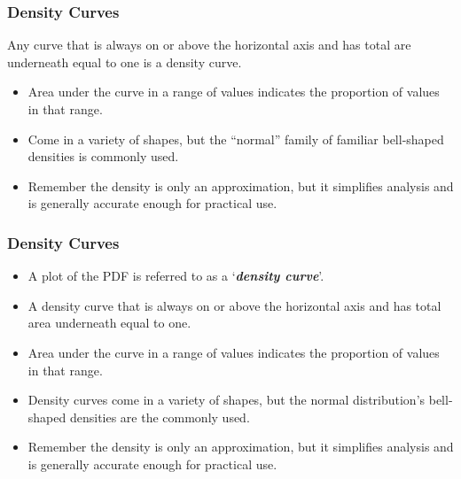\begin{frame}
\large
\frametitle{Density Curves}
Any curve that is always on or above the horizontal axis and has
total are underneath equal to one is a density curve.
\begin{itemize}
\item Area under the curve in a range of values indicates the proportion of values in that range.
\item Come in a variety of shapes, but the ``normal” family of familiar
bell-shaped densities is commonly used.
\item Remember the density is only an approximation, but it simpliﬁes analysis and is generally accurate enough for practical
use.
\end{itemize}
\end{frame}
\begin{frame}

\frametitle{Density Curves}


\begin{itemize}
\item A plot of the PDF is referred to as a `\textbf{\emph{density curve}}'.
\item A density curve that is always on or above the horizontal axis and has total area underneath equal to one.
\item Area under the curve in a range of values indicates the proportion of values in that range.
\item Density curves come in a variety of shapes, but the normal distribution's bell-shaped densities are the commonly used.
\item Remember the density is only an approximation, but it simplifies analysis and is generally accurate enough for practical use.
\end{itemize}
\end{frame}











